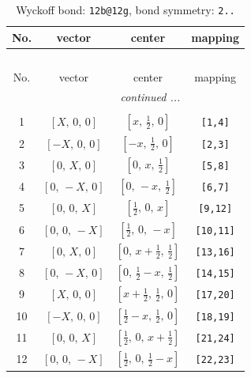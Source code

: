 \documentclass[fleqn,8pt]{jsarticle}
\begin{document}
\renewcommand{\arraystretch}{1.2}
\begin{longtable}{cccc}
\caption{Wyckoff bond: {\tt 12b@12g}, bond symmetry: {\tt 2..}}
 \\
 \hline \hline
No. & vector & center & mapping \\ \hline \endfirsthead

\multicolumn{3}{l}{\tablename\ \thetable{}} \\
 \hline \hline
No. & vector & center & mapping \\ \hline \endhead

 \hline \hline
\multicolumn{3}{r}{\footnotesize\it continued ...} \\ \endfoot

 \hline \hline
\multicolumn{3}{r}{} \\ \endlastfoot

1 & $\left[ X,\, 0,\, 0 \right]$ & $\left[ x,\, \frac{1}{2},\, 0 \right]$ & {\tt [1,4]} \\ \hline
2 & $\left[ - X,\, 0,\, 0 \right]$ & $\left[ - x,\, \frac{1}{2},\, 0 \right]$ & {\tt [2,3]} \\ \hline
3 & $\left[ 0,\, X,\, 0 \right]$ & $\left[ 0,\, x,\, \frac{1}{2} \right]$ & {\tt [5,8]} \\ \hline
4 & $\left[ 0,\, - X,\, 0 \right]$ & $\left[ 0,\, - x,\, \frac{1}{2} \right]$ & {\tt [6,7]} \\ \hline
5 & $\left[ 0,\, 0,\, X \right]$ & $\left[ \frac{1}{2},\, 0,\, x \right]$ & {\tt [9,12]} \\ \hline
6 & $\left[ 0,\, 0,\, - X \right]$ & $\left[ \frac{1}{2},\, 0,\, - x \right]$ & {\tt [10,11]} \\ \hline
7 & $\left[ 0,\, X,\, 0 \right]$ & $\left[ 0,\, x + \frac{1}{2},\, \frac{1}{2} \right]$ & {\tt [13,16]} \\ \hline
8 & $\left[ 0,\, - X,\, 0 \right]$ & $\left[ 0,\, \frac{1}{2} - x,\, \frac{1}{2} \right]$ & {\tt [14,15]} \\ \hline
9 & $\left[ X,\, 0,\, 0 \right]$ & $\left[ x + \frac{1}{2},\, \frac{1}{2},\, 0 \right]$ & {\tt [17,20]} \\ \hline
10 & $\left[ - X,\, 0,\, 0 \right]$ & $\left[ \frac{1}{2} - x,\, \frac{1}{2},\, 0 \right]$ & {\tt [18,19]} \\ \hline
11 & $\left[ 0,\, 0,\, X \right]$ & $\left[ \frac{1}{2},\, 0,\, x + \frac{1}{2} \right]$ & {\tt [21,24]} \\ \hline
12 & $\left[ 0,\, 0,\, - X \right]$ & $\left[ \frac{1}{2},\, 0,\, \frac{1}{2} - x \right]$ & {\tt [22,23]} \\
\end{longtable}
\end{document}
